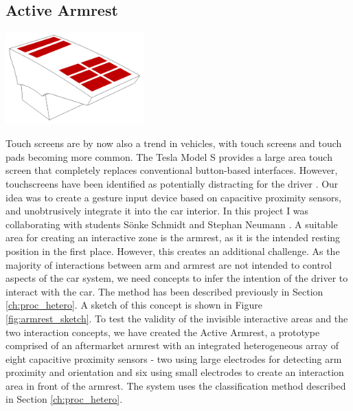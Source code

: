 \subsection{Active Armrest}
\label{ch:prot_armrest}
\begin{minipage}{\linewidth}
\centering
\includegraphics[width=0.4\textwidth]{images/active_armrest}
\label{fig:armrest_sketch}
\end{minipage}

Touch screens are by now also a trend in vehicles, with touch screens and touch pads becoming more common. The Tesla Model S provides a large area touch screen that completely replaces conventional button-based interfaces.  However, touchscreens have been identified as potentially distracting for the driver \cite{rumelin2013make}. Our idea was to create a gesture input device based on capacitive proximity sensors, and unobtrusively integrate it into the car interior. In this project I was collaborating with students Sönke Schmidt and Stephan Neumann \cite{braun2013ActiveArmrest}. A suitable area for creating an interactive zone is the armrest, as it is the intended resting position in the first place. However, this creates an additional challenge. As the majority of interactions between arm and armrest are not intended to control aspects of the car system, we need concepts to infer the intention of the driver to interact with the car. The method has been described previously in Section \ref{ch:proc_hetero}. A sketch of this concept is shown in Figure \ref{fig:armrest_sketch}. To test the validity of the invisible interactive areas and the two interaction concepts, we have created the Active Armrest, a prototype comprised of an aftermarket armrest with an integrated heterogeneous array of eight capacitive proximity sensors - two using large electrodes for detecting arm proximity and orientation and six using small electrodes to create an interaction area in front of the armrest. The system uses the classification method described in Section \ref{ch:proc_hetero}.

